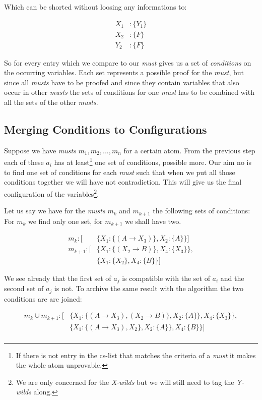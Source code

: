Which can be shorted without loosing any informations to:

\begin{align*}
	X_1 &: \{Y_1\} \\
	X_2 &: \{F\} \\
	Y_2 &: \{F\}
\end{align*}

So for every entry which we compare to our \emph{must} gives us a set of \emph{conditions} on the occurring variables. Each set represents a possible proof for the \emph{must}, but since all \emph{musts} have to be proofed and since they contain variables that also occur in other \emph{musts} the sets of conditions for one \emph{must} has to be combined with all the sets of the other \emph{musts}.

\subsection{Merging Conditions to Configurations}
Suppose we have \emph{musts} $m_1, m_2, ..., m_n$ for a certain atom. From the previous step each of these $a_i$ has at least\footnote{If there is not entry in the cs-list that matches the criteria of a \emph{must} it makes the whole atom unprovable.} one set of conditions, possible more. Our aim no is to find one set of conditions for each \emph{must} such that when we put all those conditions together we will have not contradiction. This will give us the final configuration of the variables\footnote{We are only concerned for the \emph{X-wilds} but we will still need to tag the \emph{Y-wilds} along.}.

Let us say we have for the \emph{musts} $m_k$ and $m_{k+1}$ the following sets of conditions: For $m_k$ we find only one set, for $m_{k+1}$ we shall have two.


\begin{align*}
	m_k: [	& \{X_1: \{(A \rightarrow X_3)\}, X_2: \{A\}\}]\\
	m_{k+1}: [	& \{X_1: \{(X_2 \rightarrow B)\}, X_4: \{X_3\}\},\\
			& \{X_1: \{X_2\}, X_4: \{B\}\}]
\end{align*}

We see already that the first set of $a_j$ is compatible with the set of $a_i$ and the second set of $a_j$ is not. To archive the same result with the algorithm the two conditions are are joined:

\begin{align*}
	m_k \cup m_{k+1}:[& \{	X_1: \{(A \rightarrow X_3), (X_2 \rightarrow B)\}, 
						X_2: \{A\}\}, 
						X_4: \{X_3\}\},\\
					& \{X_1: \{(A \rightarrow X_3), X_2\},
						X_2: \{A\}\}, 
						X_4: \{B\}\}]\\
\end{align*}

